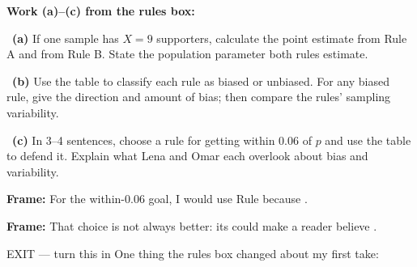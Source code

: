 \documentclass[11pt]{article}
\begin{document}
\newpage
\textbf{Work (a)--(c) from the rules box:}\par\smallskip

~\textbf{(a)} If one sample has $X=9$ supporters, calculate the point estimate from Rule A and from Rule B. State the population parameter both rules estimate.\par
\workspace{0.8in}

~\textbf{(b)} Use the table to classify each rule as biased or unbiased. For any biased rule, give the direction and amount of bias; then compare the rules' sampling variability.\par
\workspace{1.4in}

~\textbf{(c)} In 3--4 sentences, choose a rule for getting within 0.06 of $p$ and use the table to defend it. Explain what Lena and Omar each overlook about bias and variability.\par
\workspace{2.0in}

\begin{sentenceframebox}\raggedright\textbf{Frame:} For the within-0.06 goal, I would use Rule \blank[0.4in] because \blank[2.6in].\end{sentenceframebox}

\begin{sentenceframebox}\raggedright\textbf{Frame:} That choice is not always better: its \blank[1.2in] could make a reader believe \blank[2.5in].\end{sentenceframebox}

\begin{summaryexitbox}{EXIT --- turn this in}
One thing the rules box changed about my first take: \hrulefill\par
\workspace{0.4in}
\end{summaryexitbox}
\end{document}
